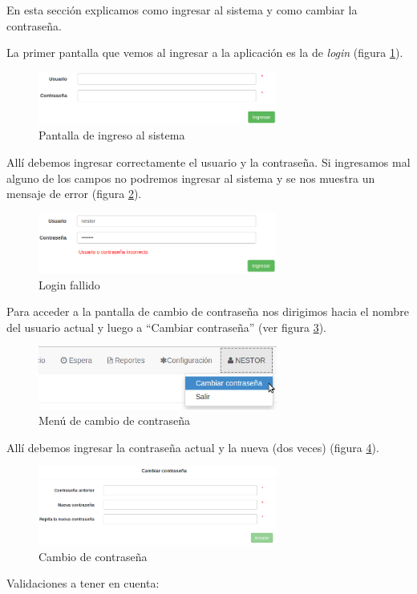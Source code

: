 En esta sección explicamos como ingresar al sistema y como cambiar la contraseña.

La primer pantalla que vemos al ingresar a la aplicación es la de \textit{login} (figura \ref{fig:login}).
\begin{figure}[h]
\centerline{\includegraphics[width=0.7\textwidth]{login.png}}
\caption{Pantalla de ingreso al sistema}
\label{fig:login}
\end{figure}
Allí debemos ingresar correctamente el usuario y la contraseña. Si ingresamos mal alguno de los campos no podremos ingresar al sistema y se nos muestra un mensaje de error (figura \ref{fig:login_fallido}).
\begin{figure}
\centerline{\includegraphics[width=0.7\textwidth]{login_fallido.png}}
\caption{Login fallido}
\label{fig:login_fallido}
\end{figure}

Para acceder a la pantalla de cambio de contraseña nos dirigimos hacia el nombre del usuario actual y luego a ``Cambiar contraseña'' (ver figura \ref{fig:menu_cambio_pass}).
\begin{figure}
\centerline{\includegraphics[width=0.7\textwidth]{menu_cambio_pass.png}}
\caption{Menú de cambio de contraseña}
\label{fig:menu_cambio_pass}
\end{figure}
Allí debemos ingresar la contraseña actual y la nueva (dos veces) (figura \ref{fig:cambio_pass}).
\begin{figure}
\centerline{\includegraphics[width=0.7\textwidth]{cambio_pass.png}}
\caption{Cambio de contraseña}
\label{fig:cambio_pass}
\end{figure}
Validaciones a tener en cuenta:

